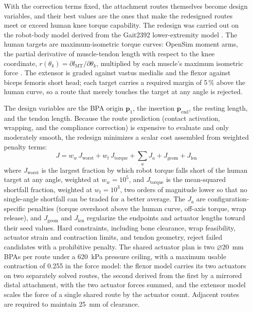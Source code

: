 \documentclass[utf8]{FrontiersinHarvard} %
\begin{document}
With the correction terms fixed, the attachment routes themselves become design variables, and their best values are the ones that make the redesigned routes meet or exceed human knee torque capability. The redesign was carried out on the robot-body model derived from the Gait2392 lower-extremity model \citep{delp_opensim_2007,seth_opensim_2018}. The human targets are maximum-isometric torque curves: OpenSim moment arms, the partial derivative of muscle-tendon length with respect to the knee coordinate, $r(\theta_{k}) = \partial l_{\mathrm{MT}}/\partial\theta_{k}$, multiplied by each muscle's maximum isometric force \citep{delp_interactive_1990,hoy_musculoskeletal_1990,yamaguchi_planar_1989,sherman_what_2013,millard_flexing_2013,thelen_adjustment_2003,seth_opensim_2011}. The extensor is graded against vastus medialis and the flexor against biceps femoris short head; each target carries a required margin of 5\,\% above the human curve, so a route that merely touches the target at any angle is rejected.

The design variables are the BPA origin $\mathbf{p}_{1}$, the insertion $\mathbf{p}_{\mathrm{end}}$, the resting length, and the tendon length. Because the route prediction (contact activation, wrapping, and the compliance correction) is expensive to evaluate and only moderately smooth, the redesign minimizes a scalar cost assembled from weighted penalty terms:
\begin{equation}
    J = w_{w}\,J_{\text{worst}} + w_{t}\,J_{\text{torque}} + \textstyle\sum_{a} J_{a} + J_{\text{geom}} + J_{\text{len}}
    \label{eq:opt_cost}
\end{equation}
where $J_{\text{worst}}$ is the largest fraction by which robot torque falls short of the human target at any angle, weighted at $w_{w} = 10^{5}$, and $J_{\text{torque}}$ is the mean-squared shortfall fraction, weighted at $w_{t} = 10^{3}$, two orders of magnitude lower so that no single-angle shortfall can be traded for a better average. The $J_{a}$ are configuration-specific penalties (torque overshoot above the human curve, off-axis torque, wrap release), and $J_{\text{geom}}$ and $J_{\text{len}}$ regularize the endpoints and actuator lengths toward their seed values. Hard constraints, including bone clearance, wrap feasibility, actuator strain and contraction limits, and tendon geometry, reject failed candidates with a prohibitive penalty. The shared actuator plan is two $\diameter$\qty{20}{\mm} BPAs per route under a \qty{620}{\kPa} pressure ceiling, with a maximum usable contraction of 0.255 in the force model: the flexor model carries its two actuators on two separately solved routes, the second derived from the first by a mirrored distal attachment, with the two actuator forces summed, and the extensor model scales the force of a single shared route by the actuator count. Adjacent routes are required to maintain \qty{25}{\mm} of clearance.
\end{document}
